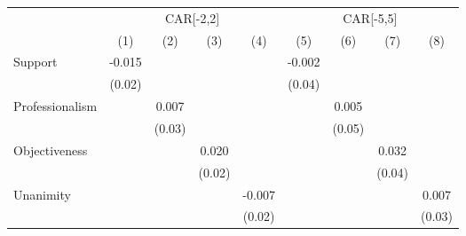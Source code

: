 {
\def\sym#1{\ifmmode^{#1}\else\(^{#1}\)\fi}
\begin{tabular}{l*{8}{c}}
\toprule
                    &\multicolumn{4}{c}{CAR[-2,2]}                                                          &\multicolumn{4}{c}{CAR[-5,5]}                                                          \\\cmidrule(lr){2-5}\cmidrule(lr){6-9}
                    &\multicolumn{1}{c}{(1)}         &\multicolumn{1}{c}{(2)}         &\multicolumn{1}{c}{(3)}         &\multicolumn{1}{c}{(4)}         &\multicolumn{1}{c}{(5)}         &\multicolumn{1}{c}{(6)}         &\multicolumn{1}{c}{(7)}         &\multicolumn{1}{c}{(8)}         \\
\midrule
Support             &      -0.015         &                     &                     &                     &      -0.002         &                     &                     &                     \\
                    &      (0.02)         &                     &                     &                     &      (0.04)         &                     &                     &                     \\
Professionalism     &                     &       0.007         &                     &                     &                     &       0.005         &                     &                     \\
                    &                     &      (0.03)         &                     &                     &                     &      (0.05)         &                     &                     \\
Objectiveness       &                     &                     &       0.020         &                     &                     &                     &       0.032         &                     \\
                    &                     &                     &      (0.02)         &                     &                     &                     &      (0.04)         &                     \\
Unanimity           &                     &                     &                     &      -0.007         &                     &                     &                     &       0.007         \\
                    &                     &                     &                     &      (0.02)         &                     &                     &                     &      (0.03)         \\

\end{tabular}}
